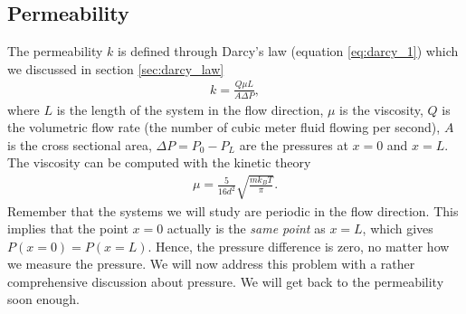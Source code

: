 \subsection{Permeability}
\label{sec:permeability_dsmc}
The permeability $k$ is defined through Darcy's law (equation \eqref{eq:darcy_1}) which we discussed in section \ref{sec:darcy_law}
\begin{align}
	\label{eq:permeability_gas}
	k = \frac{Q \mu L}{A\Delta P},
\end{align}
where $L$ is the length of the system in the flow direction, $\mu$ is the viscosity, $Q$ is the volumetric flow rate (the number of cubic meter fluid flowing per second), $A$ is the cross sectional area, $\Delta P = P_0 - P_L$ are the pressures at $x=0$ and $x=L$. The viscosity can be computed with the kinetic theory \cite{alexander1998cell}
\begin{align}
	\mu = \frac{5}{16d^2}\sqrt{\frac{mk_B T}{\pi}}.
\end{align}
Remember that the systems we will study are periodic in the flow direction. This implies that the point $x=0$ actually is the \textit{same point} as $x=L$, which gives $P(x=0) = P(x=L)$. Hence, the pressure difference is zero, no matter how we measure the pressure. We will now address this problem with a rather comprehensive discussion about pressure. We will get back to the permeability soon enough.